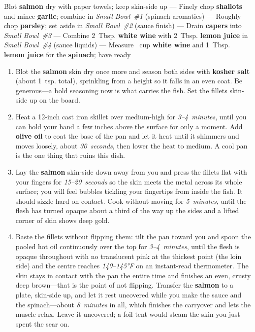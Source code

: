 \documentclass[11pt,letterpaper]{article}
\begin{document}
\noindent
Blot \textbf{salmon} dry with paper towels; keep skin-side up ---
Finely chop \textbf{shallots} and mince \textbf{garlic}; combine in \textit{Small Bowl~\#1} (spinach aromatics) ---
Roughly chop \textbf{parsley}; set aside in \textit{Small Bowl~\#2} (sauce finish) ---
Drain \textbf{capers} into \textit{Small Bowl~\#3} ---
Combine 2~Tbsp. \textbf{white wine} with 2~Tbsp. \textbf{lemon juice} in \textit{Small Bowl~\#4} (sauce liquids) ---
Measure ~cup \textbf{white wine} and 1~Tbsp. \textbf{lemon juice} for the \textbf{spinach}; have ready

\begin{enumerate}
    \item Blot the \textbf{salmon} skin dry once more and season both sides with \textbf{kosher salt} (about 1~tsp. total), sprinkling from a height so it falls in an even coat. Be generous---a bold seasoning now is what carries the fish. Set the fillets skin-side up on the board.

    \item Heat a 12-inch cast iron skillet over medium-high for \textit{3--4~minutes}, until you can hold your hand a few inches above the surface for only a moment. Add \textbf{olive oil} to coat the base of the pan and let it heat until it shimmers and moves loosely, about \textit{30~seconds}, then lower the heat to medium. A cool pan is the one thing that ruins this dish.

    \item Lay the \textbf{salmon} skin-side down away from you and press the fillets flat with your fingers for \textit{15--20~seconds} so the skin meets the metal across its whole surface; you will feel bubbles tickling your fingertips from inside the fish. It should sizzle hard on contact. Cook without moving for \textit{5~minutes}, until the flesh has turned opaque about a third of the way up the sides and a lifted corner of skin shows deep gold.

    \item Baste the fillets without flipping them: tilt the pan toward you and spoon the pooled hot oil continuously over the top for \textit{3--4~minutes}, until the flesh is opaque throughout with no translucent pink at the thickest point (the loin side) and the centre reaches \textit{140--145°F} on an instant-read thermometer. The skin stays in contact with the pan the entire time and finishes an even, crusty deep brown---that is the point of not flipping. Transfer the \textbf{salmon} to a plate, skin-side up, and let it rest uncovered while you make the sauce and the spinach---about \textit{8~minutes} in all, which finishes the carryover and lets the muscle relax. Leave it uncovered; a foil tent would steam the skin you just spent the sear on.


\end{enumerate}
\end{document}

